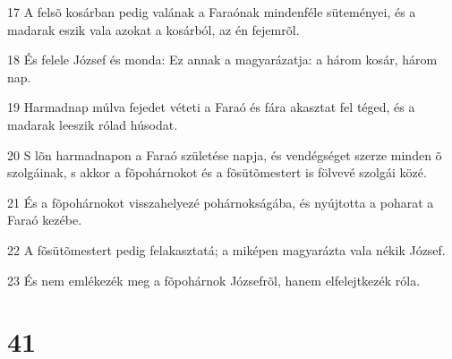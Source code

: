 \par 17 A felsõ kosárban pedig valának a Faraónak mindenféle süteményei, és a madarak eszik vala azokat a kosárból, az én fejemrõl.
\par 18 És felele József és monda: Ez annak a magyarázatja: a három kosár, három nap.
\par 19 Harmadnap múlva fejedet véteti a Faraó és fára akasztat fel téged, és a madarak leeszik rólad húsodat.
\par 20 S lõn harmadnapon a Faraó születése napja, és vendégséget szerze minden õ szolgáinak, s akkor a fõpohárnokot és a fõsütõmestert is fölvevé szolgái közé.
\par 21 És a fõpohárnokot visszahelyezé pohárnokságába, és nyújtotta a poharat a Faraó kezébe.
\par 22 A fõsütõmestert pedig felakasztatá; a miképen magyarázta vala nékik József.
\par 23 És nem emlékezék meg a fõpohárnok Józsefrõl, hanem elfelejtkezék róla.

\chapter{41}

